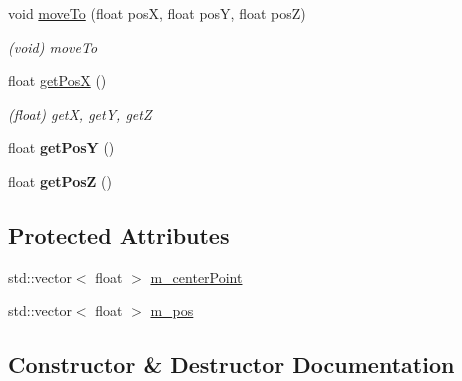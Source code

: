 {\bf }\par
\begin{DoxyCompactItemize}
\item 
void \hyperlink{classcl__figures_a00276ccac945306e2c65c0dcc7a7f558}{move\+To} (float pos\+X, float pos\+Y, float pos\+Z)
\begin{DoxyCompactList}\small\item\em (void) move\+To \end{DoxyCompactList}\end{DoxyCompactItemize}

{\bf }\par
\begin{DoxyCompactItemize}
\item 
float \hyperlink{classcl__figures_a4aff7e34bc5d177eb6332d1a40ea69ca}{get\+Pos\+X} ()
\begin{DoxyCompactList}\small\item\em (float) get\+X, get\+Y, get\+Z \end{DoxyCompactList}\item 
\hypertarget{classcl__figures_a8f5e37378abacd6075ab9df52abc109d}{}float {\bfseries get\+Pos\+Y} ()\label{classcl__figures_a8f5e37378abacd6075ab9df52abc109d}

\item 
\hypertarget{classcl__figures_a5e4861620e8f28d19d5ac29e71792b46}{}float {\bfseries get\+Pos\+Z} ()\label{classcl__figures_a5e4861620e8f28d19d5ac29e71792b46}

\end{DoxyCompactItemize}

\subsection*{Protected Attributes}
\begin{DoxyCompactItemize}
\item 
std\+::vector$<$ float $>$ \hyperlink{classcl__figures_a8db478de16f1fa9005f66c821f1c9231}{m\+\_\+center\+Point}
\item 
std\+::vector$<$ float $>$ \hyperlink{classcl__figures_a2213b88adc79462eb87457ffb18b17a2}{m\+\_\+pos}
\end{DoxyCompactItemize}


\subsection{Constructor \& Destructor Documentation}
\hypertarget{classcl__figures_ae32a5f74827021284748bb1f93ed88c0}{}
